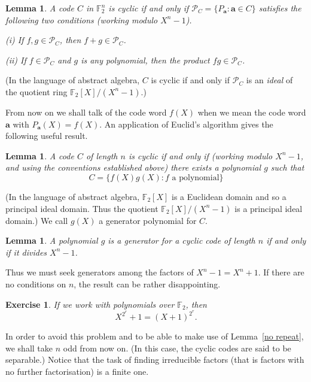 \documentclass[12pt,a4paper]{article}
\theoremstyle{plain}
\newtheorem{lemma}[theorem]{Lemma}
\newtheorem{exercise}[theorem]{Exercise}
\theoremstyle{definition}
\begin{document}
    \begin{lemma}
        A code $C$
        in ${\mathbb F}^{n}_{2}$
        is cyclic if and only if
        ${\mathcal P}_{C}=\{P_{\mathbf a}:{\mathbf a}\in C\}$
        satisfies the following two
        conditions (working modulo $X^{n}-1$).

        (i) If $f,g\in {\mathcal P}_{C}$, then $f+g\in {\mathcal P}_{C}$.

        (ii) If $f\in {\mathcal P}_{C}$ and $g$ is
        any polynomial, then the product $fg\in{\mathcal P}_{C}$.
    \end{lemma}
    \noindent
    (In the language of abstract algebra, $C$
    is cyclic if and only if
    ${\mathcal P}_{C}$ is an \emph{ideal} of the
    quotient ring ${\mathbb F}_{2}[X]/(X^{n}-1)$.)

    From now on we shall talk of the code word $f(X)$
    when we mean the code word ${\mathbf a}$ with
    $P_{\mathbf a}(X)=f(X)$. An application
    of Euclid's algorithm gives the following useful
    result.
    \begin{lemma}
        A code $C$ of length $n$ is
        cyclic if and only if (working modulo
        $X^{n}-1$, and using the conventions established
        above) there exists a polynomial $g$ such that
        \[C=\{f(X)g(X):\text{$f$ a polynomial}\}\]
    \end{lemma}

    \noindent (In the language of abstract algebra,
    ${\mathbb F}_{2}[X]$ is a Euclidean domain
    and so a principal ideal domain. Thus the
    quotient ${\mathbb F}_{2}[X]/(X^{n}-1)$ is
    a principal ideal domain.) We call $g(X)$
    a generator polynomial for $C$.

    \begin{lemma}
        A polynomial $g$ is a generator
        for a cyclic code of length $n$ if and
        only if it divides $X^{n}-1$.
    \end{lemma}
    Thus we must seek generators among the
    factors of $X^{n}-1=X^{n}+1$.
    If there are no conditions on $n$,
    the result can be rather disappointing.
    \begin{exercise}
        If we work with polynomials over
        ${\mathbb F}_{2}$, then
        \[X^{2^{r}}+1=(X+1)^{2^{r}}.\]
    \end{exercise}

    In order to avoid this problem
    and to be able to make use of
    Lemma~\ref{no repeat}, we shall
    take $n$ odd from now on. (In this case,
    the cyclic codes are said to be separable.)
    Notice that the task of finding
    irreducible factors  (that is factors with
    no further factorisation) is a finite one.
\end{document}
